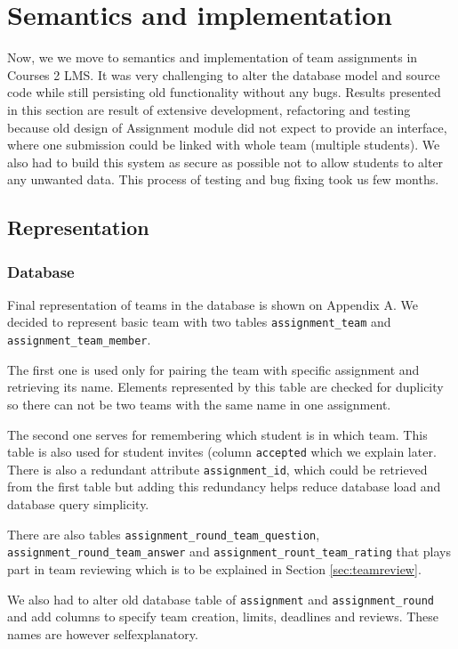 \section{Semantics and implementation}
Now, we we move to semantics and implementation of team assignments in Courses 2 LMS. It was very challenging to alter the database model and source code while still persisting old functionality without any bugs. Results presented in this section are result of extensive development, refactoring and testing because old design of Assignment module did not expect to provide an interface, where one submission could be linked with whole team (multiple students). We also had to build this system as secure as possible not to allow students to alter any unwanted data. This process of testing and bug fixing took us few months.

\subsection{Representation}

\subsubsection{Database}

Final representation of teams in the database is shown on Appendix A. We decided to represent basic team with two tables \texttt{assignment\_team} and \texttt{assignment\_team\_member}.

The first one is used only for pairing the team with specific assignment and retrieving its name. Elements represented by this table are checked for duplicity so there can not be two teams with the same name in one assignment.

The second one serves for remembering which student is in which team. This table is also used for student invites (column \texttt{accepted} which we explain later. There is also a redundant attribute \texttt{assignment\_id}, which could be retrieved from the first table but adding this redundancy helps reduce database load and database query simplicity.

There are also tables \texttt{assignment\_round\_team\_question}, \texttt{assignment\_round\_team\_answer} and \texttt{assignment\_rount\_team\_rating} that plays part in team reviewing which is to be explained in Section \ref{sec:teamreview}.

We also had to alter old database table of \texttt{assignment} and \texttt{assignment\_round} and add columns to specify team creation, limits, deadlines and reviews. These names are however self\-explanatory.

